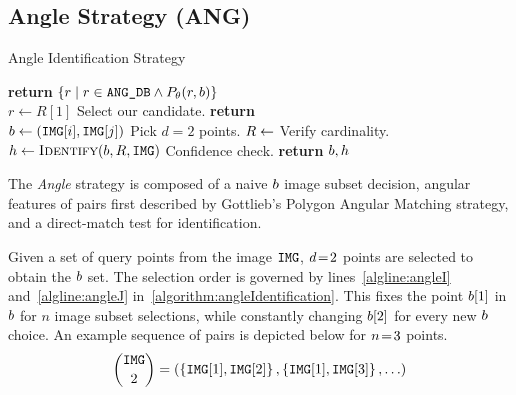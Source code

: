 \subsection{Angle Strategy (ANG)}\label{subsec:angleMethod}
\newcommand{\invalidBijection}{\If{$\solutionmap$ is valid}}
\begin{algorithm}
    \caption{Angle Identification Strategy} \label{algorithm:angleIdentification}
    \begin{algorithmic}[1]
    	\State \textbf{return} $\{ r \mid r \in \texttt{ANG\_DB} \land P_\theta(r, b) \}$
    	\EndFunction
        \\
        \State $r \gets R[1]$ \Comment Select our candidate.
        \State \textbf{return} 
        \EndFunction
        \\
         \label{algline:angleI}
         \label{algline:angleJ}
        \State $b \gets \left(\texttt{IMG}[i], \texttt{IMG}[j]\right)$ \Comment Pick $d=2$ points. 
        \State $R \gets $ 
         \Comment Verify cardinality.
        \State $h \gets \Call{Identify}{b, R, \imageset}$
        \invalidBijection \Comment Confidence check.
        \State \textbf{return} $b, h$
        \EndIf
        \EndIf
        \EndFor
        \EndFor
        \EndProcedure
    \end{algorithmic}
\end{algorithm}

The \textit{Angle} strategy is composed of a naive $b$ image subset decision, angular features of pairs first described by Gottlieb's Polygon Angular Matching strategy, and a direct-match test for identification.

Given a set of query points from the image $\texttt{IMG}$, $d \!=\! 2$ points are selected to obtain the $b$ set.
The selection order is governed by lines~\ref{algline:angleI} and~\ref{algline:angleJ} in~\autoref{algorithm:angleIdentification}.
This fixes the point $b[1]$ in $b$ for $n$ image subset selections, while constantly changing $b[2]$ for every new $b$ choice.
An example sequence of pairs is depicted below for $n \!=\! 3$ points.
\begin{equation}
    \binom{\texttt{IMG}}{2} = \left(\left\{ \texttt{IMG}[1], \texttt{IMG}[2] \right\}, \left\{ \texttt{IMG}[1],\texttt{IMG}[3] \right\}, \ldots \right)
\end{equation}

